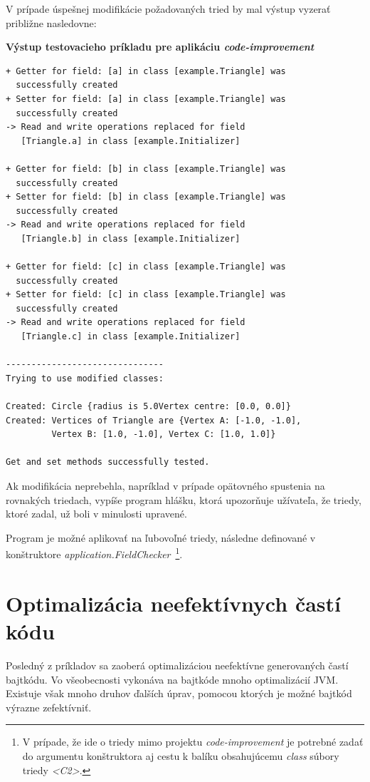 \documentclass[11pt,final,oneside]{fithesis}
\newenvironment{example}[1]
{
\vspace{3mm}
\noindent\textbf{#1}
\vspace{2mm}
}
{
\vspace{3mm}
}
\begin{document}
V prípade úspešnej modifikácie požadovaných tried by mal výstup vyzerať približne nasledovne:

\begin{example}{Výstup testovacieho príkladu pre aplikáciu
\textit{code-improvement}}
\begin{verbatim}
+ Getter for field: [a] in class [example.Triangle] was
  successfully created
+ Setter for field: [a] in class [example.Triangle] was
  successfully created
-> Read and write operations replaced for field
   [Triangle.a] in class [example.Initializer]

+ Getter for field: [b] in class [example.Triangle] was
  successfully created
+ Setter for field: [b] in class [example.Triangle] was
  successfully created
-> Read and write operations replaced for field
   [Triangle.b] in class [example.Initializer]

+ Getter for field: [c] in class [example.Triangle] was
  successfully created
+ Setter for field: [c] in class [example.Triangle] was
  successfully created
-> Read and write operations replaced for field
   [Triangle.c] in class [example.Initializer]

-------------------------------
Trying to use modified classes: 

Created: Circle {radius is 5.0Vertex centre: [0.0, 0.0]}
Created: Vertices of Triangle are {Vertex A: [-1.0, -1.0],
         Vertex B: [1.0, -1.0], Vertex C: [1.0, 1.0]}

Get and set methods successfully tested.
\end{verbatim}
\end{example}

Ak modifikácia neprebehla, napríklad v prípade opätovného spustenia na 
rovnakých triedach, vypíše program hlášku, ktorá upozorňuje užívateľa, že 
triedy, ktoré zadal, už boli v minulosti upravené.

Program je možné aplikovať na ľubovoľné triedy, následne definované v
 konštruktore
\textit{application.FieldChecker}~\footnote{V prípade, že ide o triedy mimo 
projektu \textit{code-improvement} je potrebné zadať do argumentu konštruktora 
aj cestu k balíku obsahujúcemu \textit{class} súbory triedy \textit{<C2>}.}.

\section{Optimalizácia neefektívnych častí kódu}
Posledný z príkladov sa zaoberá optimalizáciou neefektívne generovaných častí 
bajtkódu. Vo všeobecnosti vykonáva na bajtkóde mnoho optimalizácií JVM. 
Existuje však mnoho druhov ďalších úprav, pomocou ktorých je možné bajtkód 
výrazne zefektívniť.
\end{document}
